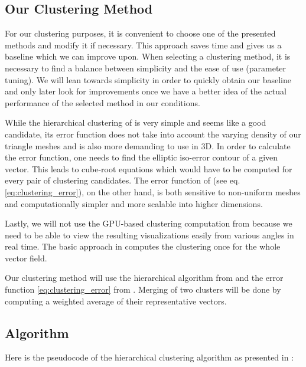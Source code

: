 \subsection{Our Clustering Method}

For our clustering purposes, it is convenient to choose one of the presented methods and modify it if necessary. This approach saves time and gives us a baseline which we can improve upon. When selecting a clustering method, it is necessary to find a balance between simplicity and the ease of use (parameter tuning). We will lean towards simplicity in order to quickly obtain our baseline and only later look for improvements once we have a better idea of the actual performance of the selected method in our conditions.

While the hierarchical clustering of \citet{Telea99} is very simple and seems like a good candidate, its error function does not take into account the varying density of our triangle meshes and is also more demanding to use in 3D. In order to calculate the error function, one needs to find the elliptic iso-error contour of a given vector. This leads to cube-root equations which would have to be computed for every pair of clustering candidates. The error function of \citet{Peng12} (see eq. \ref{eq:clustering_error}), on the other hand, is both sensitive to non-uniform meshes and computationally simpler and more scalable into higher dimensions.

Lastly, we will not use the GPU-based clustering computation from \citet{Peng12} because we need to be able to view the resulting visualizations easily from various angles in real time. The basic approach in \citet{Telea99} computes the clustering once for the whole vector field.

Our clustering method will use the hierarchical algorithm from \citet{Telea99} and the error function \ref{eq:clustering_error} from \citet{Peng12}. Merging of two clusters will be done by computing a weighted average of their representative vectors.
\subsection{Algorithm}

Here is the pseudocode of the hierarchical clustering algorithm as presented in \citet{Telea99}:

